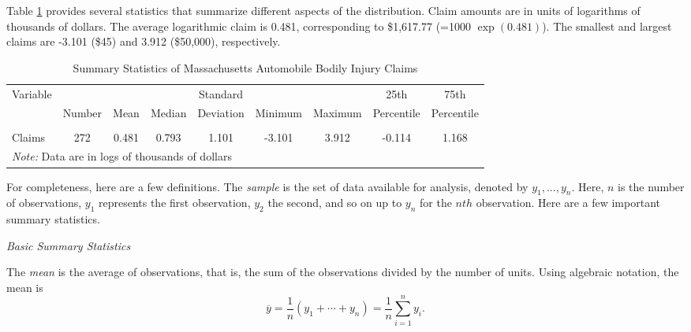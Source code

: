 Table \ref{T1:BISummaryStats} provides several statistics that
summarize different aspects of the distribution. Claim amounts are
in units of logarithms of thousands of dollars. The average
logarithmic claim is 0.481, corresponding to \$1,617.77 (=1000 $\exp
(0.481)$). The smallest and largest claims are -3.101 (\$45) and
3.912 (\$50,000), respectively.

\bigskip

\begin{table}[h]
 \caption{\label{T1:BISummaryStats} Summary
Statistics of Massachusetts Automobile Bodily Injury Claims}
\begin{tabular}{l|cccccccc}
\hline
Variable &  &  &  & Standard &  &  & 25th & 75th \\
& Number & Mean & Median & Deviation & Minimum & Maximum &
Percentile & Percentile  \\ \cline{2-9} \vspace{-.05in} \\
Claims & 272 & 0.481 & 0.793 & 1.101 & -3.101 & 3.912 & -0.114 & 1.168 \\
\hline
\multicolumn{9}{l}{\textit{Note: }Data are in logs of thousands of dollars}%
\end{tabular}

\linetjed
\end{table}

For completeness, here are a few definitions. The \emph{sample} is
the set of data available for analysis, denoted by $y_1,...,y_n$.
Here, $n$ is the number of observations, $y_1$ represents the first
observation, $y_2$ the second, and so on up to $y_n$ for the $nth$
observation. Here are a few important summary statistics.

\bigskip{}
 


\boxedjed

\textit{Basic Summary Statistics} \enumerate
\item The
\emph{mean} is the average of observations, that is, the sum of the
observations divided by the number of units. Using algebraic
notation, the mean is\
\begin{equation*}
\overline{y}=\frac{1}{n}\left( y_1 + \cdots + y_n \right) =
\frac{1}{n} \sum_{i=1}^{n} y_i.
\end{equation*}

